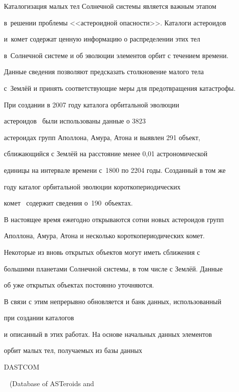 Каталогизация малых тел Солнечной системы является важным этапом 


в~решении проблемы <<астероидной опасности>>. Каталоги астероидов 


и~комет содержат ценную информацию о распределении этих тел 


в~Солнечной системе и об эволюции элементов орбит с течением времени.


Данные сведения позволяют предсказать столкновение малого тела 


с~Землёй и принять соответствующие меры для предотвращения катастрофы.





При создании в 2007 году каталога орбитальной эволюции


астероидов~\cite{Abramov:bib:astcat} были использованы данные о 3823


астероидах групп Аполлона, Амура, Атона и выявлен 291 объект,


сближающийся с Землёй на расстояние менее 0,01 астрономической


единицы на интервале времени с~1800 по 2204 годы. Созданный в том же


году каталог орбитальной эволюции короткопериодических


комет~\cite{Abramov:bib:comcat} содержит сведения о~190~объектах.





В настоящее время ежегодно открываются сотни новых астероидов групп


Аполлона, Амура, Атона и несколько короткопериодических комет.


Некоторые из вновь открытых объектов могут иметь сближения с


большими планетами Солнечной системы, в том числе с Землёй. Данные


об уже открытых объектах постоянно уточняются.





В связи с этим непрерывно обновляется и банк данных, использованный


при создании каталогов~\cite{Abramov:bib:astcat,Abramov:bib:comcat}


и описанный в этих работах. На основе начальных данных элементов


орбит малых тел, получаемых из базы данных {\tt


DASTCOM}~\cite{Abramov:bib:astorb} (Database of ASTeroids and


